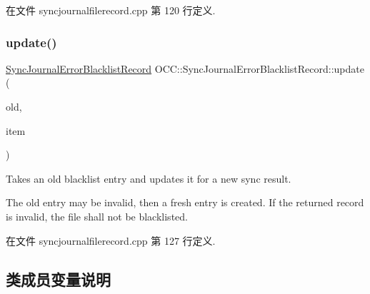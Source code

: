 在文件 syncjournalfilerecord.\+cpp 第 120 行定义.

\mbox{\label{class_o_c_c_1_1_sync_journal_error_blacklist_record_ad0ec0283db421504beae92457a65b9af}} 
\subsubsection{\texorpdfstring{update()}{update()}}
{\footnotesize\ttfamily \hyperlink{class_o_c_c_1_1_sync_journal_error_blacklist_record}{Sync\+Journal\+Error\+Blacklist\+Record} O\+C\+C\+::\+Sync\+Journal\+Error\+Blacklist\+Record\+::update (\begin{DoxyParamCaption}\item[{const \hyperlink{class_o_c_c_1_1_sync_journal_error_blacklist_record}{Sync\+Journal\+Error\+Blacklist\+Record} \&}]{old,  }\item[{const \hyperlink{class_o_c_c_1_1_sync_file_item}{Sync\+File\+Item} \&}]{item }\end{DoxyParamCaption})\hspace{0.3cm}{\ttfamily [static]}}

Takes an old blacklist entry and updates it for a new sync result.

The old entry may be invalid, then a fresh entry is created. If the returned record is invalid, the file shall not be blacklisted. 

在文件 syncjournalfilerecord.\+cpp 第 127 行定义.



\subsection{类成员变量说明}
\mbox{\label{class_o_c_c_1_1_sync_journal_error_blacklist_record_a44c0da4b7ca183e1ca7f6ab4d384e9be}} 
